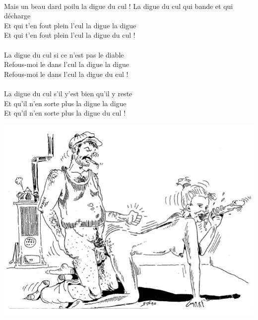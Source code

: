 \\Mais un beau dard poilu la digue du cul !
\breakpage
La digue du cul qui bande et qui décharge  ~\bissimple
\\Et qui t'en fout plein l'cul la digue la digue
\\Et qui t'en fout plein l'cul la digue du cul !
\\\\La digue du cul si ce n'est pas le diable  ~~\bissimple
\\Refous-moi le dans l'cul la digue la digue
\\Refous-moi le dans l'cul la digue du cul !
\\\\La digue du cul s'il y'est bien qu'il y reste ~\bissimple
\\Et qu'il n'en sorte plus la digue la digue
\\Et qu'il n'en sorte plus la digue du cul !
\bigskip
\bigskip
\bigskip
\begin{center}
\includegraphics[width=1\textwidth]{images/image4.PNG}
\end{center}

\breakpage